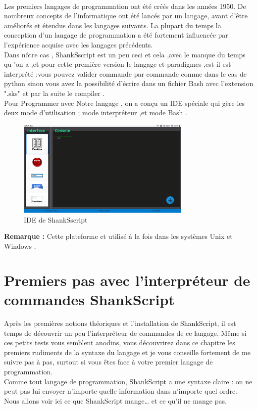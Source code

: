\\[0.5cm]
Les premiers langages de programmation ont été créés dans les années 1950. De nombreux concepts de l'informatique ont été lancés par un langage, avant d'être améliorés et étendus dans les langages suivants. La plupart du temps la conception d'un langage de programmation a été fortement influencée par l'expérience acquise avec les langages précédents.
\\[0.5cm]
Dans nôtre cas , ShankSscript est un peu ceci et cela ,avec le manque du temps qu 'on a ,et pour cette première version le langage et paradigmes ,est il est interprété ;vous pouvez valider commande par commande comme dans le cas de python sinon vous avez la possibilité d'écrire dans un fichier Bash avec l'extension ".sks" et par la suite le compiler .
\\[0.5cm]
Pour Programmer avec Notre langage , on a conçu un IDE spéciale qui gère les deux mode d'utilisation ; mode interpréteur ,et mode Bash .
\\

\begin{figure}[!h]
   \centering
   \includegraphics[width=0.75\textwidth]{IDE_1.png} 
   \caption{\label{étiquette} IDE de ShankSscript}
\end{figure}


\textbf{Remarque :} Cette plateforme et utilisé à la fois dans les systèmes Unix et Windows . 


\section{Premiers pas avec l'interpréteur de commandes ShankScript}

Après les premières notions théoriques et l'installation de ShankScript, il est temps de découvrir un peu l'interpréteur de commandes de ce langage. Même si ces petits tests vous semblent anodins, vous découvrirez dans ce chapitre les premiers rudiments de la syntaxe du langage et je vous conseille fortement de me suivre pas à pas, surtout si vous êtes face à votre premier langage de programmation.
\\[0.5cm]
Comme tout langage de programmation, ShankScript a une syntaxe claire : on ne peut pas lui envoyer n'importe quelle information dans n'importe quel ordre. Nous allons voir ici ce que ShankScript mange… et ce qu'il ne mange pas.

